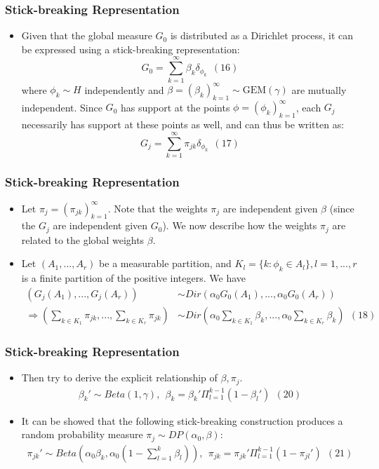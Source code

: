 \documentclass{beamer}
\begin{document}
\begin{frame}
    \frametitle{Stick-breaking Representation}
    \begin{itemize}
        \item Given that the global measure $G_0$ is distributed as a Dirichlet process, it can be expressed using a stick-breaking representation:
$$G_0=\sum_{k=1}^\infty \beta_k\delta_{\phi_k}\ \ (16)$$
where $\phi_k\sim H$ independently and $\beta = (\beta_k)_{k=1}^\infty \sim \text{GEM}(\gamma)$ are mutually independent. Since $G_0$ has support at the points $\phi = (\phi_k)^\infty_{k=1}$, each $G_j$ necessarily has support at these points as well, and
can thus be written as:
$$G_j=\sum_{k=1}^\infty \pi_{jk}\delta_{\phi_k}\ \ (17)$$
    \end{itemize}
\end{frame}
\begin{frame}
    \frametitle{Stick-breaking Representation}
    \begin{itemize}
        \item Let $\pi_{j} = (\pi_{jk})^\infty_{k=1}$. Note that the weights $\pi_j$ are independent given $\beta$ (since the $G_j$ are independent given $G_0$). We now describe how the weights $\pi_j$ are related to the global weights $\beta$.
        \item Let $(A_1,...,A_r)$ be a measurable partition, and $K_l=\{k:\phi_k \in A_l\},l=1,...,r$ is a finite partition of the positive integers. We have 
$$\begin{aligned}(G_j(A_1),...,G_j(A_r)) &\sim Dir(\alpha_0G_0(A_1),...,\alpha_0G_0(A_r))\\
\Rightarrow (\sum_{k\in K_1}\pi_{jk},...,\sum_{k\in K_r}\pi_{jk})&\sim Dir(\alpha_0\sum_{k\in K_1}\beta_{k},...,\alpha_0\sum_{k\in K_r}\beta_{k})\ \ (18)\end{aligned}$$
    \end{itemize}
\end{frame}
\begin{frame}
    \frametitle{Stick-breaking Representation}
    \begin{itemize}
        \item Then try to derive the explicit relationship of $\beta, \pi_j$. 
$$\begin{aligned}\beta_k'\sim Beta(1,\gamma),\ \ \beta_k=\beta_k'\Pi_{l=1}^{k-1}(1-\beta_l')\ \ (20)\end{aligned}$$
        \item It can be showed that the following stick-breaking construction produces a random probability measure $\pi_j\sim DP(\alpha_0,\beta)$:
$$\begin{aligned}\pi_{jk}'\sim Beta(\alpha_0\beta_k,\alpha_0(1-\sum_{l=1}^k \beta_l)),\ \ \pi_{jk}=\pi_{jk}'\Pi_{l=1}^{k-1}(1-\pi_{jl}')\ \ (21)\end{aligned}$$
    \end{itemize}
\end{frame}
\end{document}
